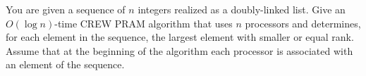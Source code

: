 You are given a sequence of $n$ integers realized as a doubly-linked
list.  Give an $O(\log  n)$-time CREW PRAM algorithm that uses $n$
processors and determines, for each element in the sequence, the
largest element with smaller or equal rank.  Assume that at the
beginning of the algorithm each processor is associated with an
element of the sequence.
